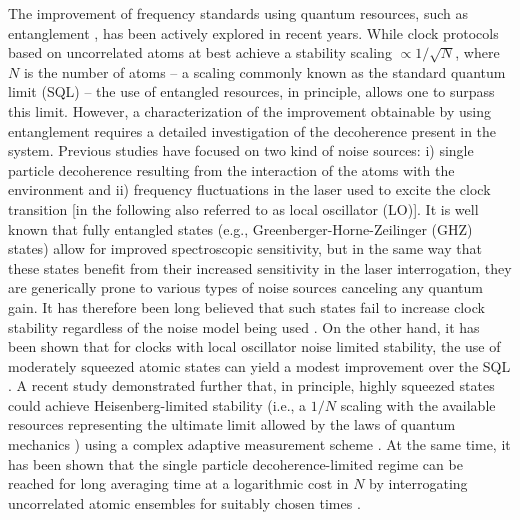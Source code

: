 The improvement of frequency standards using quantum resources, such as
entanglement \cite{Buzek1999, Andre2004,LouchetChauvet:2010fs,Rosenband2012_numerical,
Borregaard2013_nearHeisenberg},
has been actively explored in recent years. While clock protocols
based on uncorrelated atoms at best achieve a stability scaling
$\propto1/\sqrt{N}$, where $N$ is the number of atoms -- a
scaling commonly known as the standard quantum limit (SQL) \cite{Caves1980} --
the use of entangled resources, in principle, allows one to surpass this limit.
However, a characterization of the improvement obtainable by using entanglement
 requires a detailed investigation of the decoherence present in the system.
 Previous studies have focused on two kind of noise sources: i) single particle
 decoherence resulting from the interaction of the atoms with the environment
 and ii) frequency fluctuations in the laser used to excite the clock transition
 [in the following also referred to as local oscillator (LO)].
  It is well known that fully entangled states (e.g.,
  Greenberger-Horne-Zeilinger (GHZ) states) allow for improved spectroscopic sensitivity, but in the same way
 that these states benefit from their increased sensitivity in the laser
 interrogation, they are generically prone to various types of noise sources
 canceling any quantum gain. It has therefore been long believed that such
 states fail to increase clock stability regardless of the noise model being used
 \cite{Bollinger1996, Wineland1998, Rosenband2012_numerical,Huelga1997}. On the other hand, it has been shown that
for clocks with local oscillator noise limited stability, the use of
moderately squeezed atomic states can yield a modest improvement over the SQL
\cite{Andre2004,LouchetChauvet:2010fs}.
 A recent study demonstrated further that, in principle, highly squeezed states
could achieve Heisenberg-limited stability (i.e., a $1/N$ scaling
with the available resources representing the ultimate limit allowed by the laws
of quantum mechanics \cite{Giovanetti2011}) using a complex adaptive
measurement scheme \cite{Borregaard2013_nearHeisenberg}.
 At the same time, it has been shown that the single particle
 decoherence-limited regime can be reached for long averaging time at
a logarithmic cost in $N$ by interrogating uncorrelated atomic
ensembles for suitably chosen times \cite{Rosenband2013, Borregaard2013}.

